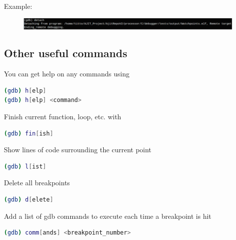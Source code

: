 \documentclass[a4paper, 11pt]{article}
\begin{document}
Example:
\begin{figure}[H]
	\centering
	\includegraphics[width=0.8\columnwidth]{Figs/twelve.png}
\end{figure}
\subsection*{Other useful commands}
You can get help on any commands using
\begin{lstlisting}[language=bash]
(gdb) h[elp]
(gdb) h[elp] <command>
\end{lstlisting}
Finish current function, loop, etc. with
\begin{lstlisting}[language=bash]
(gdb) fin[ish]
\end{lstlisting}
Show lines of code surrounding the current point
\begin{lstlisting}[language=bash]
(gdb) l[ist]
\end{lstlisting}
Delete all breakpoints
\begin{lstlisting}[language=bash]
(gdb) d[elete]
\end{lstlisting}
Add a list of gdb commands to execute each time a breakpoint is hit
\begin{lstlisting}[language=bash]
(gdb) comm[ands] <breakpoint_number>
\end{lstlisting}
\end{document}
